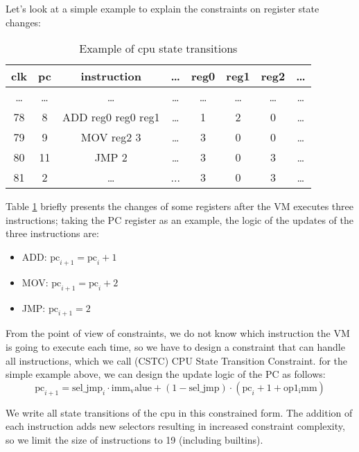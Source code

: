 Let's look at a simple example to explain the constraints on register state changes:
\begin{table}[!ht]
    \centering
    \begin{tabular}{|c|c|c|c|c|c|c|c|}
        \hline
        \rowcolor{gray} clk & pc    & instruction        & \dots & reg0  & reg1  & reg2  & \dots \\
        \hline
        \dots               & \dots & \dots              & \dots & \dots & \dots & \dots & \dots \\
        \hline
        78                  & 8     & ADD reg0 reg0 reg1 & \dots & 1     & 2     & 0     & \dots \\
        \hline
        79                  & 9     & MOV reg2 3         & \dots & 3     & 0     & 0     & \dots \\
        \hline
        80                  & 11    & JMP 2              & \dots & 3     & 0     & 3     & \dots \\
        \hline
        81                  & 2     & \dots              & ...   & 3     & 0     & 3     & \dots \\
        \hline
    \end{tabular}
    \caption{Example of cpu state transitions}
    \label{table:example-cpu-state-transitions}
\end{table}

Table \ref{table:example-cpu-state-transitions} briefly presents the changes of some registers after the VM executes three
instructions; taking the PC register as an example, the logic of the updates of the three instructions are:
\begin{itemize}
    \item ADD: $\mathrm{pc}_{i+1} = \mathrm{pc}_i + 1$
    \item MOV: $\mathrm{pc}_{i+1} = \mathrm{pc}_i + 2$
    \item JMP: $\mathrm{pc}_{i+1} = 2$
\end{itemize}

From the point of view of constraints, we do not know which instruction the VM is going to execute each time, so we have to
design a constraint that can handle all instructions, which we call (CSTC) CPU State Transition Constraint. for the simple
example above, we can design the update logic of the PC as follows:
\[ \mathrm{pc}_{i+1} = \mathrm{sel\_jmp}_i \cdot \mathrm{imm_value} + (1 - \mathrm{sel\_jmp}) \cdot (\mathrm{pc}_i + 1 + \mathrm{op1_imm}) \]

We write all state transitions of the cpu in this constrained form. The addition of each instruction adds new selectors resulting
in increased constraint complexity, so we limit the size of instructions to 19 (including builtins).

